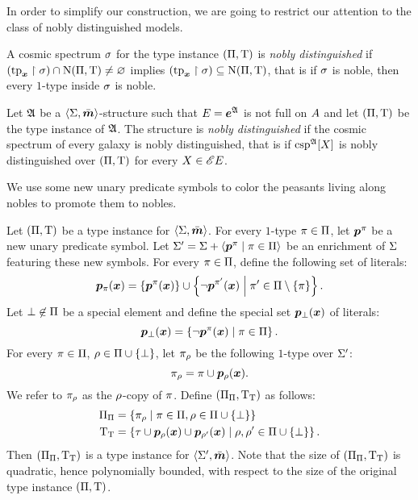 In order to simplify our construction, we are going to restrict our attention
to the class of nobly distinguished models.
\begin{definition}\label{def:nobly-distinguished-csp}
A cosmic spectrum $\sigma$ for the type instance $(\Pi,\mathrm{T})$ is \emph{nobly
distinguished} if $(\operatorname{tp}_{\bm{x}}\restriction\sigma) \cap \mathrm{\mathrm{N}}(\Pi,\mathrm{T}) \neq \varnothing$
implies $(\operatorname{tp}_{\bm{x}}\restriction\sigma) \subseteq \mathrm{\mathrm{N}}(\Pi,\mathrm{T})$, that is if $\sigma$
is noble, then every $1$-type inside $\sigma$ is noble.
\end{definition}
\begin{definition}\label{def:nobly-distinguished-structure}
Let $\mathfrak{A}$ be a $\left\langle \mathrm{\Sigma},\bar{\bm{m}} \right\rangle$-structure such that $E = \bm{e}^{\mathfrak{A}}$ is
not full on $A$ and let $(\Pi,\mathrm{T})$ be the type instance of $\mathfrak{A}$. The
structure is \emph{nobly distinguished} if the cosmic spectrum of every galaxy
is nobly distinguished, that is if $\operatorname{csp}^{\mathfrak{A}}[X]$ is nobly distinguished
over $(\Pi,\mathrm{T})$ for every $X \in {\mathscr{E}E}$.
\end{definition}
We use some new unary predicate symbols to color the peasants living along 
nobles to promote them to nobles.
\begin{definition}
Let $(\Pi,\mathrm{T})$ be a type instance for $\left\langle \mathrm{\Sigma},\bar{\bm{m}} \right\rangle$.
For every $1$-type $\pi \in \Pi$, let $\bm{p}^{\pi}$ be a new unary predicate
symbol. Let $\mathrm{\Sigma'} = \mathrm{\Sigma} + \left\langle \bm{p}^{\pi} \mathrel{}\middle|\mathrel{} \pi \in \Pi \right\rangle$ be an
enrichment of $\mathrm{\Sigma}$ featuring these new symbols. For every $\pi \in \Pi$,
define the following set of literals:
\[
  \bm{p}_{\pi}(\bm{x}) = \left\{\bm{p}^{\pi}(\bm{x})\right\} \cup
  \left\{\lnot\bm{p}^{{\pi'}}(\bm{x})\mathrel{}\middle|\mathrel{}{\pi'} \in \Pi \setminus \left\{\pi\right\}\right\}.
\]
Let $\bot \not\in \Pi$ be a special element and define the special set
$\bm{p}_{\bot}(\bm{x})$ of literals:
\[
  \bm{p}_{\bot}(\bm{x}) = 
  \left\{\lnot\bm{p}^{\pi}(\bm{x})\mathrel{}\middle|\mathrel{}\pi \in \Pi\right\}.
\]
For every $\pi \in \Pi$, $\rho \in \Pi\cup\left\{\bot\right\}$,
let ${\pi}_{\rho}$ be the following $1$-type over $\mathrm{\Sigma'}$:
\[
  {\pi}_{\rho} = \pi \cup \bm{p}_{\rho}(\bm{x}).
\]
We refer to ${\pi}_{\rho}$ as the $\rho$-copy of $\pi$.
Define $({\Pi}_{\Pi},{\mathrm{T}}_{\mathrm{T}})$ as follows:
\begin{align*}
  {\Pi}_{\Pi} &= 
  \left\{{\pi}_{\rho}\mathrel{}\middle|\mathrel{}\pi\in\Pi, \rho\in\Pi\cup\left\{\bot\right\}\right\} \\
  {\mathrm{T}}_{\mathrm{T}} &= \left\{\tau \cup \bm{p}_{\rho}(\bm{x}) \cup
  \bm{p}_{{\rho'}}(\bm{x})\mathrel{}\middle|\mathrel{}\rho,{\rho'} \in \Pi\cup\left\{\bot\right\}\right\}.
\end{align*}
Then $({\Pi}_{\Pi},{\mathrm{T}}_{\mathrm{T}})$ is a type instance for
$\left\langle \mathrm{\Sigma'},\bar{\bm{m}} \right\rangle$.
Note that the size of $({\Pi}_{\Pi},{\mathrm{T}}_{\mathrm{T}})$ is quadratic, hence
polynomially bounded, with respect to the size of the original type instance
$(\Pi,\mathrm{T})$.
\end{definition}
